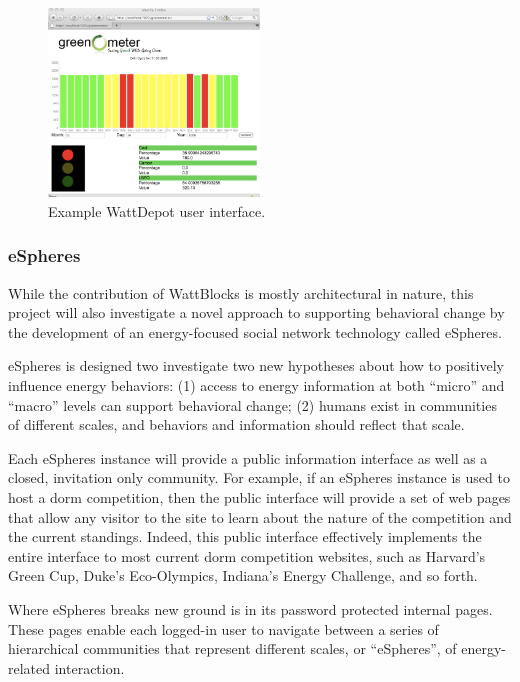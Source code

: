 \begin{figure}[th]
  \center
  \includegraphics[width=0.5\textwidth]{greenometer.2.eps}
  \caption{\small Example WattDepot user interface.}
 \label{fig:WattDepotUI}
\end{figure} 


\subsubsection{eSpheres}

While the contribution of WattBlocks is mostly architectural in nature,
this project will also investigate a novel approach to supporting
behavioral change by the development of an energy-focused social network
technology called eSpheres.

eSpheres is designed two investigate two new hypotheses about how to
positively influence energy behaviors: (1) access to energy information at
both ``micro'' and ``macro'' levels can support behavioral change; (2)
humans exist in communities of different scales, and behaviors and
information should reflect that scale.

Each eSpheres instance will provide a public information interface as well
as a closed, invitation only community.  For example, if an eSpheres
instance is used to host a dorm competition, then the public interface will
provide a set of web pages that allow any visitor to the site to learn
about the nature of the competition and the current standings.  Indeed,
this public interface effectively implements the entire interface to most
current dorm competition websites, such as Harvard's Green Cup, Duke's
Eco-Olympics, Indiana's Energy Challenge, and so forth. 

Where eSpheres breaks new ground is in its password protected internal
pages.  These pages enable each logged-in user to navigate between a series
of hierarchical communities that represent different scales, or
``eSpheres'', of energy-related interaction.

